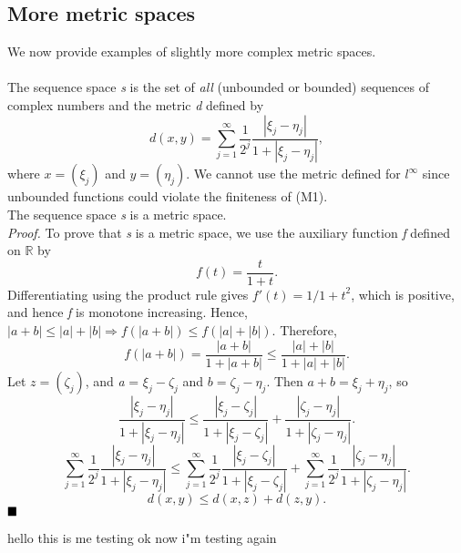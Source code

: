 \documentclass[11pt]{article}
\begin{document}
\subsection{More metric spaces}
We now provide examples of slightly more complex metric spaces.
\\\\
\noindent
{}
The sequence space \textit{s} is the set of \textit{all} (unbounded or bounded) sequences of complex numbers and the metric \textit{d} defined by
$$d(x, y) = \sum_{j=1}^\infty \frac{1}{2^j}\frac{|\xi_j - \eta_j|}{1 + |\xi_j - \eta_j|},$$
where $x = (\xi_j)$ and $y = (\eta_j)$. We cannot use the metric defined for $l^\infty$ since unbounded functions could violate the finiteness of (M1).
\\
 The sequence space \textit{s} is a metric space. 
\\\textit{Proof.}
To prove that \textit{s} is a metric space, we use the auxiliary function \textit{f} defined on $\mathbb{R}$ by
$$ f(t) = \frac{t}{1+t}.$$
Differentiating using the product rule gives $f'(t) = 1/{1+t}^2$, which is positive, and hence \textit{f} is monotone increasing. Hence, $|a + b| \leq |a| + |b| \Rightarrow f(|a+b|) \leq f(|a| + |b|).$ Therefore,
$$ f(|a + b|) = \frac{|a+b|}{1 + |a+b|} \leq \frac{|a| +|b|}{1 + |a| + |b|}.$$
Let $z = (\zeta_j)$, and \textit{a} = $\xi_j - \zeta_j$ and $\textit{b} = \zeta_j - \eta_j$. Then $a + b = \xi_j + \eta_j$, so 
$$\frac{|\xi_j - \eta_j|}{1 +|\xi_j - \eta_j|} \leq \frac{|\xi_j - \zeta_j|}{1+ |\xi_j - \zeta_j|} + \frac{|\zeta_j - \eta_j|}{1+|\zeta_j - \eta_j|}.$$
$$\sum_{j=1}^{\infty}\frac{1}{2^j}\frac{|\xi_j - \eta_j|}{1 +|\xi_j - \eta_j|} \leq \sum_{j=1}^{\infty}\frac{1}{2^j}\frac{|\xi_j - \zeta_j|}{1+ |\xi_j - \zeta_j|} + \sum_{j=1}^{\infty}\frac{1}{2^j}\frac{|\zeta_j - \eta_j|}{1+|\zeta_j - \eta_j|}.$$
$$d(x,y) \leq d(x, z) + d(z, y).$$ $\hfill \blacksquare$

hello this is me testing
ok now i"m testing again
\end{document}
